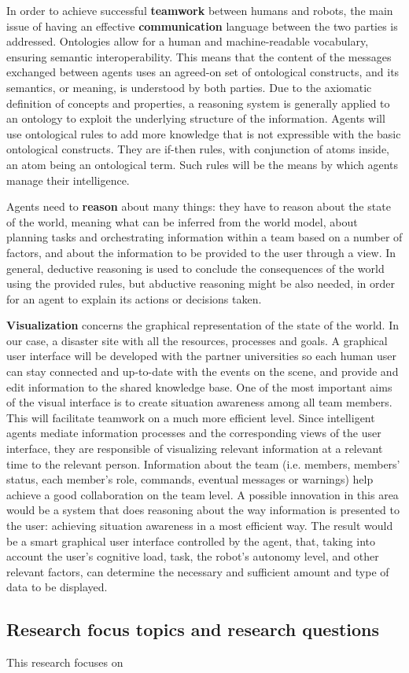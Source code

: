 In order to achieve successful \textbf{teamwork} between humans and robots, the main issue of having an effective \textbf{communication} language between the two parties is addressed. Ontologies allow for a human and machine-readable vocabulary, ensuring semantic interoperability. This means that the content of the messages exchanged between agents uses an agreed-on set of ontological constructs, and its semantics, or meaning, is understood by both parties. Due to the axiomatic definition of concepts and properties, a reasoning system is generally applied to an ontology to exploit the underlying structure of the information. Agents will use ontological rules to add more knowledge that is not expressible with the basic ontological constructs. They are if-then rules, with conjunction of atoms inside, an atom being an ontological term.
Such rules will be the means by which agents manage their intelligence. 

Agents need to \textbf{reason} about many things: they have to reason about the state of the world, meaning what can be inferred from the world model, about planning tasks and orchestrating information within a team based on a number of factors, and about the information to be provided to the user through a view. In general, deductive reasoning is used to conclude the consequences of the world using the provided rules, but abductive reasoning might be also needed, in order for an agent to explain its actions or decisions taken.

\textbf{Visualization} concerns the graphical representation of the state of the world. In our case, a disaster site with all the resources, processes and goals. A graphical user interface will be developed with the partner universities so each human user can stay connected and up-to-date with the events on the scene, and provide and edit information to the shared knowledge base. One of the most important aims of the visual interface is to create situation awareness among all team members. This will facilitate teamwork on a much more efficient level.
Since intelligent agents mediate information processes and the corresponding views of the user interface, they are responsible of visualizing relevant information at a relevant time to the relevant person. Information about the team (i.e. members, members' status, each member's role, commands, eventual messages or warnings) help achieve a good collaboration on
the team level. A possible innovation in this area would be a system that does reasoning about the way information is presented to the user: achieving situation awareness in a most efficient way. The result would be a smart graphical user interface controlled by the agent, that, taking into account the user's cognitive load, task, the robot's autonomy level, and other relevant factors, can determine the necessary and sufficient amount and type of data to be displayed.


\subsection{Research focus topics and research questions}
    
This research focuses on     
    
  
  
  
  
  
  
  
  